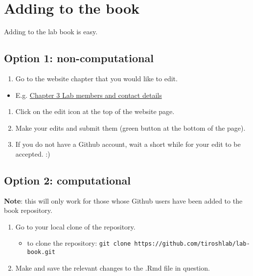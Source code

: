 \documentclass[]{book}
\providecommand{\tightlist}{%
  \setlength{\itemsep}{0pt}\setlength{\parskip}{0pt}}
\begin{document}
\section{Adding to the book}\label{adding-to-the-book}

Adding to the lab book is easy.

\subsection{Option 1:
non-computational}\label{option-1-non-computational}

\begin{enumerate}
\def\labelenumi{\arabic{enumi}.}
\tightlist
\item
  Go to the website chapter that you would like to edit.
\end{enumerate}

\begin{itemize}
\tightlist
\item
  E.g. \href{https://tiroshlab.github.io/lab-book/contact.html}{Chapter
  3 Lab members and contact details}
\end{itemize}

\begin{enumerate}
\def\labelenumi{\arabic{enumi}.}
\setcounter{enumi}{1}
\tightlist
\item
  Click on the edit icon at the top of the website page.
\item
  Make your edits and submit them (green button at the bottom of the
  page).
\item
  If you do not have a Github account, wait a short while for your edit
  to be accepted. :)
\end{enumerate}

\subsection{Option 2: computational}\label{option-2-computational}

\textbf{Note}: this will only work for those whose Github users have
been added to the book repository.

\begin{enumerate}
\def\labelenumi{\arabic{enumi}.}
\tightlist
\item
  Go to your local clone of the repository.

  \begin{itemize}
  \tightlist
  \item
    to clone the repository:
    \texttt{git\ clone\ https://github.com/tiroshlab/lab-book.git}\\
  \end{itemize}
\item
  Make and save the relevant changes to the .Rmd file in question.
\end{enumerate}
\end{document}
